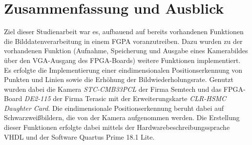 \documentclass[ngerman,12pt]{article} %
\begin{document}
{%
\section{Zusammenfassung und Ausblick}
\label{sec:Zusammenfassung und Ausblick}
Ziel dieser Studienarbeit war es, aufbauend auf bereits vorhandenen Funktionen die Bilddatenverarbeitung in einem FGPA voranzutreiben. Dazu wurden zu der vorhandenen Funktion (Aufnahme, Speicherung und Ausgabe eines Kamerabildes über den VGA-Ausgang des FPGA-Boards) weitere Funktionen implementiert. Es erfolgte die Implementierung einer eindimensionalen Positionserkennung von Punkten und Linien sowie die Erhöhung der Bildwiederholungsrate. Genutzt wurden dabei die Kamera \textit{STC-CMB33PCL} der Firma Semtech und das FPGA-Board \textit{DE2-115} der Firma Terasic mit der Erweiterungskarte \textit{CLR-HSMC Daughter Card}. Die eindimensionale Positionserkennung beruht dabei auf Schwarzweißbildern, die von der Kamera aufgenommen werden. Die Erstellung dieser Funktionen erfolgte dabei mittels der Hardwarebeschreibungssprache VHDL und der Software Quartus Prime 18.1 Lite.\newline

}
\end{document}
